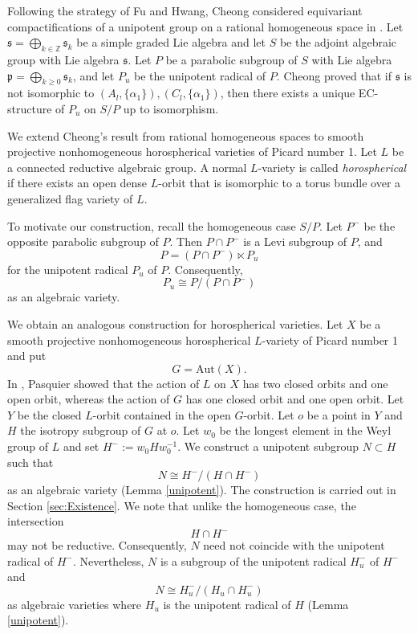 \documentclass{amsart}
\theoremstyle{definition}
\theoremstyle{remark}
\newcommand{\Z}{\mathbb{Z}}
\begin{document}
Following the strategy of Fu and Hwang, Cheong considered equivariant compactifications of a unipotent group on a rational homogeneous space in \cite{C}. Let $\mathfrak{s} = \bigoplus_{k \in \Z} \mathfrak{s}_k$ be a simple graded Lie algebra and let $S$ be the adjoint algebraic group with Lie algebra $\mathfrak{s}$. Let $P$ be a parabolic subgroup of $S$ with Lie algebra $\mathfrak{p} = \bigoplus_{k\geq 0} \mathfrak{s}_k$, and let $P_u$ be the unipotent radical of $P$. Cheong proved that if $\mathfrak{s}$ is not isomorphic to $(A_l, \{\alpha_1\}), (C_l, \{\alpha_1\})$, then there exists a unique EC-structure of $P_u$ on $S/P$ up to isomorphism.

We extend Cheong's result from rational homogeneous spaces to smooth projective nonhomogeneous horospherical varieties of Picard number 1. Let $L$ be a connected reductive algebraic group. A normal $L$-variety is called \textit{horospherical} if there exists an open dense $L$-orbit that is isomorphic to a torus bundle over a generalized flag variety of $L$.

To motivate our construction, recall the homogeneous case $S/P$. Let $P^{-}$ be the opposite parabolic subgroup of $P$. Then $P \cap P^-$ is a Levi subgroup of $P$, and 
\[P = (P\cap P^-) \ltimes P_u\]
for the unipotent radical $P_u$ of $P$.
Consequently, 
\[P_u \cong P / (P \cap P^-)\]
as an algebraic variety.

We obtain an analogous construction for horospherical varieties. Let $X$ be a smooth projective nonhomogeneous horospherical $L$-variety of Picard number 1 and put 
\[G = \mathrm{Aut}(X).\]
In \cite{P}, Pasquier showed that the action of $L$ on $X$ has two closed orbits and one open orbit, whereas the action of $G$ has one closed orbit and one open orbit. Let $Y$ be the closed $L$-orbit contained in the open $G$-orbit. Let $o$ be a point in $Y$ and $H$ the isotropy subgroup of $G$ at $o$. Let $w_0$ be the longest element in the Weyl group of $L$ and set $H^-:= w_0Hw_0^{-1}$. We construct a unipotent subgroup $N \subset H$ such that 
\[N \cong H^- /(H \cap H^-)\]
as an algebraic variety (Lemma \ref{unipotent}). The construction is carried out in Section \ref{sec:Existence}. We note that unlike the homogeneous case, the intersection 
\[H \cap H^-\]
may not be reductive. Consequently, $N$ need not coincide with the unipotent radical of $H^-$. Nevertheless, $N$ is a subgroup of the unipotent radical $H_u^-$ of $H^-$ and
\[N \cong H_u^- /(H_u \cap H_u^-)\]
as algebraic varieties where $H_u$ is the unipotent radical of $H$ (Lemma \ref{unipotent}).
\end{document}
